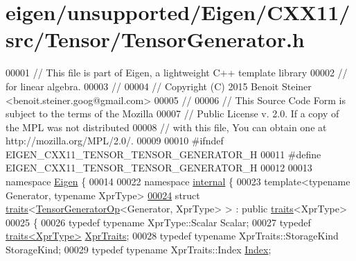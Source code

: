 \hypertarget{eigen_2unsupported_2_eigen_2_c_x_x11_2src_2_tensor_2_tensor_generator_8h_source}{}\section{eigen/unsupported/\+Eigen/\+C\+X\+X11/src/\+Tensor/\+Tensor\+Generator.h}
\label{eigen_2unsupported_2_eigen_2_c_x_x11_2src_2_tensor_2_tensor_generator_8h_source}

\begin{DoxyCode}
00001 \textcolor{comment}{// This file is part of Eigen, a lightweight C++ template library}
00002 \textcolor{comment}{// for linear algebra.}
00003 \textcolor{comment}{//}
00004 \textcolor{comment}{// Copyright (C) 2015 Benoit Steiner <benoit.steiner.goog@gmail.com>}
00005 \textcolor{comment}{//}
00006 \textcolor{comment}{// This Source Code Form is subject to the terms of the Mozilla}
00007 \textcolor{comment}{// Public License v. 2.0. If a copy of the MPL was not distributed}
00008 \textcolor{comment}{// with this file, You can obtain one at http://mozilla.org/MPL/2.0/.}
00009 
00010 \textcolor{preprocessor}{#ifndef EIGEN\_CXX11\_TENSOR\_TENSOR\_GENERATOR\_H}
00011 \textcolor{preprocessor}{#define EIGEN\_CXX11\_TENSOR\_TENSOR\_GENERATOR\_H}
00012 
00013 \textcolor{keyword}{namespace }\hyperlink{namespace_eigen}{Eigen} \{
00014 
00022 \textcolor{keyword}{namespace }\hyperlink{namespaceinternal}{internal} \{
00023 \textcolor{keyword}{template}<\textcolor{keyword}{typename} Generator, \textcolor{keyword}{typename} XprType>
\hyperlink{struct_eigen_1_1internal_1_1traits_3_01_tensor_generator_op_3_01_generator_00_01_xpr_type_01_4_01_4}{00024} \textcolor{keyword}{struct }\hyperlink{struct_eigen_1_1internal_1_1traits}{traits}<\hyperlink{class_eigen_1_1_tensor_generator_op}{TensorGeneratorOp}<Generator, XprType> > : \textcolor{keyword}{public} 
      \hyperlink{struct_eigen_1_1internal_1_1traits}{traits}<XprType>
00025 \{
00026   \textcolor{keyword}{typedef} \textcolor{keyword}{typename} XprType::Scalar Scalar;
00027   \textcolor{keyword}{typedef} \hyperlink{struct_eigen_1_1internal_1_1traits}{traits<XprType>} \hyperlink{struct_eigen_1_1internal_1_1traits}{XprTraits};
00028   \textcolor{keyword}{typedef} \textcolor{keyword}{typename} XprTraits::StorageKind StorageKind;
00029   \textcolor{keyword}{typedef} \textcolor{keyword}{typename} XprTraits::Index \hyperlink{namespace_eigen_a62e77e0933482dafde8fe197d9a2cfde}{Index};

\end{DoxyCode}

